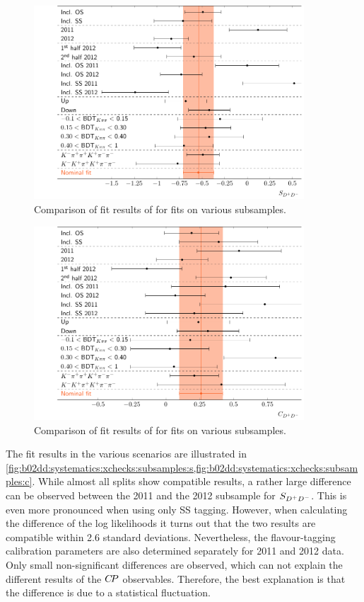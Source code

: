 \begin{figure}[thb]
\centering
\includegraphics[width=0.9\textwidth]{07-B02DD/tikz/pdf/SComparison.pdf}
\caption{
Comparison of fit results of \SDD for fits on various subsamples.}
\label{fig:b02dd:systematics:xchecks:subsamples:s}
\end{figure}
\begin{figure}[thb]
\centering
\includegraphics[width=0.9\textwidth]{07-B02DD/tikz/pdf/CComparison.pdf}
\caption{
Comparison of fit results of \CDD for fits on various subsamples.}
\label{fig:b02dd:systematics:xchecks:subsamples:c}
\end{figure}
The fit results in the various scenarios are illustrated in
\cref{fig:b02dd:systematics:xchecks:subsamples:s,fig:b02dd:systematics:xchecks:subsamples:c}.
While almost all splits show compatible results, a rather large difference can
be observed between the 2011 and the 2012 subsample for $S_{{{D}^+}{{D}^-}}$. This is even
more pronounced when using only SS tagging. However, when calculating the
difference of the log likelihoods it turns out that the two results are
compatible within \num{2.6} standard deviations. Nevertheless, the
flavour-tagging calibration parameters are also determined separately for 2011
and 2012 data. Only small non-significant differences are observed, which can
not explain the different results of the ${C\!P}$ observables. Therefore, the
best explanation is that the difference is due to a statistical fluctuation.

